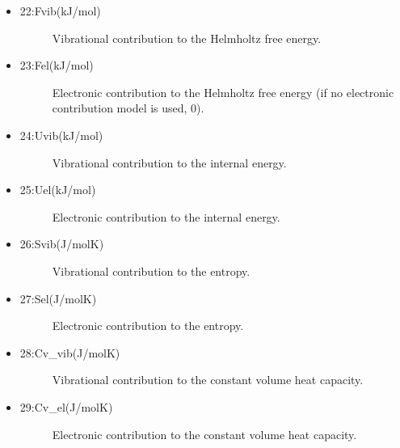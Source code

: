 \documentclass[a4paper]{article}
\begin{document}
\begin{itemize}
\begin{description}
\end{description}

\item 
\begin{description}
\item[{22:Fvib(kJ/mol)}] \leavevmode 
Vibrational contribution to the Helmholtz free energy.

\end{description}

\item 
\begin{description}
\item[{23:Fel(kJ/mol)}] \leavevmode 
Electronic contribution to the Helmholtz free energy (if no
electronic contribution model is used, 0).

\end{description}

\item 
\begin{description}
\item[{24:Uvib(kJ/mol)}] \leavevmode 
Vibrational contribution to the internal energy.

\end{description}

\item 
\begin{description}
\item[{25:Uel(kJ/mol)}] \leavevmode 
Electronic contribution to the internal energy.

\end{description}

\item 
\begin{description}
\item[{26:Svib(J/molK)}] \leavevmode 
Vibrational contribution to the entropy.

\end{description}

\item 
\begin{description}
\item[{27:Sel(J/molK)}] \leavevmode 
Electronic contribution to the entropy.

\end{description}

\item 
\begin{description}
\item[{28:Cv\_vib(J/molK)}] \leavevmode 
Vibrational contribution to the constant volume heat capacity.

\end{description}

\item 
\begin{description}
\item[{29:Cv\_el(J/molK)}] \leavevmode 
Electronic contribution to the constant volume heat capacity.

\end{description}
\end{itemize}
\end{document}
